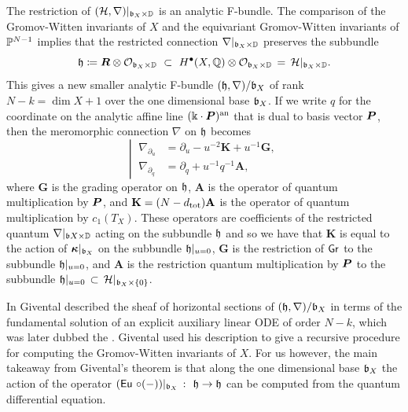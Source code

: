 \documentclass[twoside,leqno]{article}
\numberwithin{equation}{section}
\theoremstyle{plain}
\theoremstyle{definition}
\begin{document}
The restriction of $(\mathcal H,\nabla)|_{\mathfrak{b}_{X}\times \mathbb D}$ is an analytic F-bundle. The comparison \cite{Givental_Equivariant_Gromov-Witten_invariants} of the Gromov-Witten invariants of $X$ and the equivariant Gromov-Witten invariants of $\mathbb P^{N-1}$ implies that the restricted connection $\nabla|_{\mathfrak{b}_{X}\times \mathbb D}$ preserves the subbundle 
\[
\mathfrak{h} \coloneqq \boldsymbol{R} \otimes \mathcal O_{\mathfrak{b}_{X}\times \mathbb D} \ \subset \ H^{\bullet}(X,\mathbb Q)\otimes \mathcal O_{\mathfrak{b}_{X}\times \mathbb D} \, = \, \mathcal H|_{\mathfrak{b}_{X}\times \mathbb D}.
\]
This gives  a new smaller analytic F-bundle $(\mathfrak{h},\nabla)/\mathfrak{b}_{X}$ of rank $N - k = \dim X + 1$ over the one dimensional base $\mathfrak{b}_{X}$. If we write $q$ for the coordinate on the analytic affine line $(\Bbbk\cdot \boldsymbol{P})^{\operatorname{an}}$ that is dual to  
basis vector $\boldsymbol{P}$, then the meromorphic connection $\nabla$ on $\mathfrak{h}$ becomes
\begin{equation} \label{eq:ansmallnabla}
\left| \
\begin{aligned}
\nabla_{\partial_{u}} & = \partial_{u} - u^{-2} \mathbf{K} + u^{-1} \mathbf{G}, \\
\nabla_{\partial_{q}} & = \partial_{q} + u^{-1}q^{-1} \mathbf{A},
\end{aligned}
\right.
\end{equation}
where $\mathbf{G}$ is the grading operator on $\mathfrak{h}$, $\mathbf{A}$ is the operator of quantum multiplication by $\boldsymbol{P}$, and $\mathbf{K} = (N-d_{\operatorname{tot}})\mathbf{A}$ is the operator of quantum multiplication by $c_{1}(T_{X})$. These operators are coefficients of the restricted quantum  $\nabla|_{\mathfrak{b}{X}\times \mathbb D}$ acting on the subbundle $\mathfrak{h}$ and so we have that $\mathbf{K}$ is equal to the action of $\boldsymbol{\kappa}|_{\mathfrak{b}_{X}}$ on the subbundle $\mathfrak{h}|_{u=0}$, $\mathbf{G}$ is the restriction of $\mathsf{Gr}$ to the subbundle $\mathfrak{h}|_{u=0}$, and $\mathbf{A}$ is the restriction quantum multiplication by $\boldsymbol{P}$ to the subbundle $\mathfrak{h}|_{u=0} \, \subset \, \mathcal H|_{\mathfrak{b}_{X}\times \{0\}}$.



In \cite[Section~9]{Givental_Equivariant_Gromov-Witten_invariants} Givental described the sheaf of horizontal sections of $(\mathfrak{h},\nabla)/\mathfrak{b}_{X}$ in terms of the fundamental solution of an explicit auxiliary linear ODE of order $N-k$, which was later dubbed the . Givental used his   description to give  a recursive procedure for computing the Gromov-Witten invariants of $X$. 
For us however, the main takeaway from Givental's  theorem is that along the one dimensional base $\mathfrak{b}_{X}$ the action of the operator $(\operatorname{\mathsf{Eu}}\, \circ (-))|_{\mathfrak{b}_{X}}  \ \colon \  \mathfrak{h} \to \mathfrak{h}$ can be computed from the quantum differential equation. 
\end{document}
